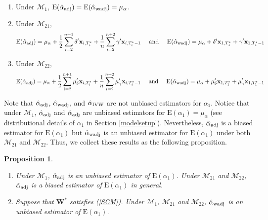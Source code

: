 \documentclass[11pt]{article}
\def\mbf#1{\mathbf{#1}} %
\def\mc#1{\mathcal{#1}} %
\def\E#1{\mathrm{E}(#1)} %
\newtheorem{prop}{Proposition}
\theoremstyle{definition}
\begin{document}
 \begin{enumerate}[label = (\roman*)]
    \item Under $\mc{M}_{1}$, $\E{\hat{\alpha}_{\rm adj}}=\E{\hat{\alpha}_{\rm wadj}} = \mu_{\alpha}$.
    \item Under $\mc{M}_{21}$, 
    \begin{align*}
      \E{\hat{\alpha}_{\rm adj}} = \mu_{\alpha} + \frac{1}{2} \sum_{i=2}^{n+1} \delta' \mbf{x}_{i, T_i^*} + \frac{1}{n} \sum_{i=2}^{n+2} \gamma' \mbf{x}_{i, T_i^*-1} 
      \quad \text{ and } \quad 
       \E{\hat{\alpha}_{\rm wadj}} = \mu_{\alpha} + \delta'\mbf{x}_{1, T_1^*} + \gamma' \mbf{x}_{1, T_1^*-1}
    \end{align*}
    \item Under $\mc{M}_{22}$,
    \begin{align*}
      \E{\hat{\alpha}_{\rm adj}} = \mu_{\alpha} + \frac{1}{2} \sum_{i=2}^{n+1} \mu_{\delta}' \mbf{x}_{i, T_i^*} + \frac{1}{n} \sum_{i=2}^{n+2}  \mu_{\gamma}'\mbf{x}_{i, T_i^*-1} 
      \quad \text{ and } \quad 
       \E{\hat{\alpha}_{\rm wadj}} = \mu_{\alpha} + \mu_{\delta}'\mbf{x}_{1, T_1^*} + \mu_{\gamma}' \mbf{x}_{1, T_1^*-1}
    \end{align*}
  \end{enumerate}

Note that $\hat{\alpha}_{\rm adj}$, $\hat{\alpha}_{\rm wadj}$, and $\hat{\alpha}_{\rm IVW}$ are not unbiased estimators for $\alpha_1$. Notice that under $\mc{M}_{1}$, $\hat{\alpha}_{\rm adj}$ and $\hat{\alpha}_{\rm adj}$ are unbiased estimators for $\E{\alpha_1}=\mu_{\alpha}$ (see distributional details of $\alpha_1$ in Section \ref{modelsetup}). Nevertheless, $\hat{\alpha}_{\rm adj}$ is a biased estimator for $\E{\alpha_1}$ but $\hat{\alpha}_{\rm wadj}$ is an unbiased estimator for $\E{\alpha_1}$ under both $\mc{M}_{21}$ and $\mc{M}_{22}$. Thus, we collect these results  as the following proposition. 

\begin{prop}
\label{unbiased} 
\quad 
\begin{enumerate}[label = (\roman*)]
  \item Under $\mc{M}_1$, $\hat{\alpha}_{\rm adj}$ is an unbiased estimator of $\E{\alpha_1}$. Under $\mc{M}_{21}$ and $\mc{M}_{22}$, $\hat{\alpha}_{\rm adj}$ is a biased estimator of $\E{\alpha_1}$ in general.
  \item Suppose that $\mbf{W}^*$ satisfies (\ref{SCM}). Under $\mc{M}_{1}$, $\mc{M}_{21}$ and $\mc{M}_{22}$, $\hat{\alpha}_{\rm wadj}$ is an unbiased estimator of $\E{\alpha_1}$.
\end{enumerate}
\end{prop}
\end{document}
